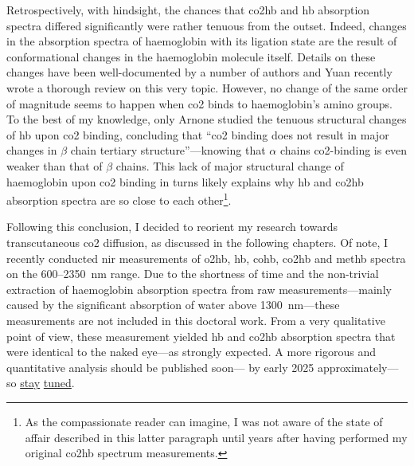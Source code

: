 Retrospectively, with hindsight, the chances that \gls{co2hb} and \gls{hb} absorption spectra differed significantly were rather tenuous from the outset. Indeed, changes in the absorption spectra of haemoglobin with its ligation state are the result of conformational changes in the haemoglobin molecule itself\cite{antonini1970}. Details on these changes have been well-documented by a number of authors\cite{perutz1964, paoli1996, park2006hb, bringas2017} and Yuan \etal{} recently wrote a thorough review on this very topic\cite{yuan2015}. However, no change of the same order of magnitude seems to happen when \gls{co2} binds to haemoglobin's amino groups. To the best of my knowledge, only Arnone \etal{} studied the tenuous structural changes of \gls{hb} upon \gls{co2} binding, concluding that \enquote{\gls{co2} binding does not result in major changes in $\beta$ chain tertiary structure}\cite{arnone1980}---knowing that $\alpha$ chains \gls{co2}-binding is even weaker than that of $\beta$ chains. This lack of major structural change of haemoglobin upon \gls{co2} binding in turns likely explains why \gls{hb} and \gls{co2hb} absorption spectra are so close to each other\footnote{As the compassionate reader can imagine, I was not aware of the state of affair described in this latter paragraph until years after having performed my original \gls{co2hb} spectrum measurements.}.

Following this conclusion, I decided to reorient my research towards transcutaneous \gls{co2} diffusion, as discussed in the following chapters. Of note, I recently conducted \gls{nir} measurements of \gls{o2hb}, \gls{hb}, \gls{cohb}, \gls{co2hb} and \gls{methb} spectra on the 600--2350~nm range. Due to the shortness of time and the non-trivial extraction of haemoglobin absorption spectra from raw measurements---mainly caused by the significant absorption of water above 1300~nm---these measurements are not included in this doctoral work. From a very qualitative point of view, these measurement yielded \gls{hb} and \gls{co2hb} absorption spectra that were identical to the naked eye---as strongly expected. A more rigorous and quantitative analysis should be published soon---\ie{} by early 2025 approximately---so \href{https://wayback-api.archive.org/web/20240612134342/https://scholar.google.fr/citations?user=DCR_h9YAAAAJ&hl=fr}{stay} \href{https://wayback-api.archive.org/web/20240612134527/https://www.researchgate.net/profile/Emmanuel-Dervieux-2}{tuned}.